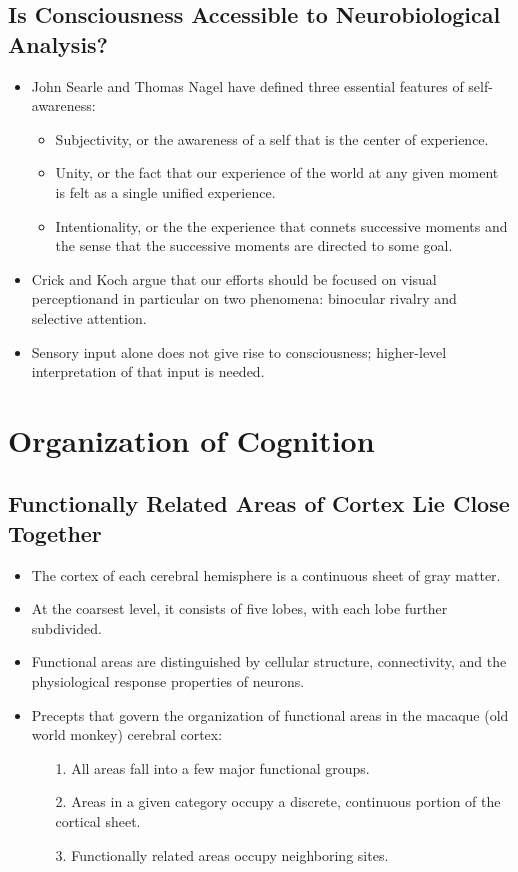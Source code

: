 \documentclass[12pt,a4paper]{article}
\begin{document}
\subsection{Is Consciousness Accessible to Neurobiological Analysis?}
\begin{itemize}
    \item John Searle and Thomas Nagel have defined three essential features of self-awareness:
        \begin{itemize}
            \item Subjectivity, or the awareness of a self that is the center of experience.
            \item Unity, or the fact that our experience of the world at any given moment is felt as a single unified experience.
            \item Intentionality, or the the experience that connets successive moments and the sense that the successive moments are directed to some goal.
        \end{itemize}
    \item Crick and Koch argue that our efforts should be focused on visual perceptionand in particular on two phenomena: binocular rivalry and selective attention.
    \item Sensory input alone does not give rise to consciousness; higher-level interpretation of that input is needed.
\end{itemize}

\clearpage
\section{Organization of Cognition}
\subsection{Functionally Related Areas of Cortex Lie Close Together}
\begin{itemize}
    \item The cortex of each cerebral hemisphere is a continuous sheet of gray matter.
    \item At the coarsest level, it consists of five lobes, with each lobe further subdivided.
    \item Functional areas are distinguished by cellular structure, connectivity, and the physiological response properties of neurons.
    \item Precepts that govern the organization of functional areas in the macaque (old world monkey) cerebral cortex:
        \begin{itemize}
            \item[1.] All areas fall into a few major functional groups.
            \item[2.] Areas in a given category occupy a discrete, continuous portion of the cortical sheet.
            \item[3.] Functionally related areas occupy neighboring sites. 
        \end{itemize}
\end{itemize}
\end{document}
